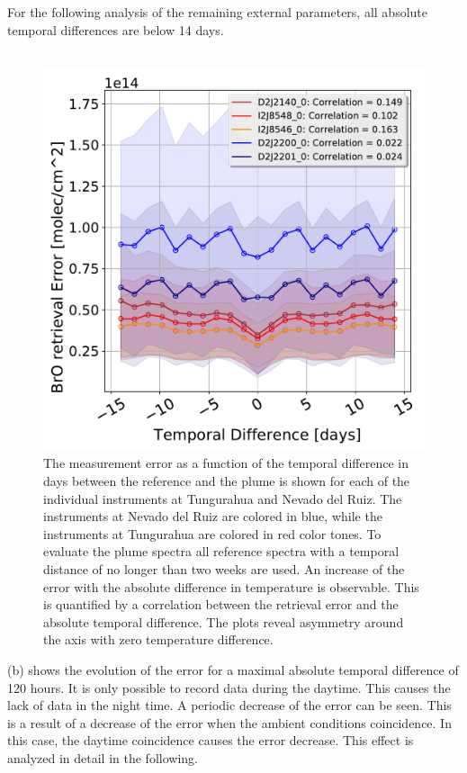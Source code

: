 For the following analysis of the remaining external parameters, all absolute temporal differences are below 14 days.\\
\\
\begin{figure}
    \centering
    \includegraphics[width=0.7\linewidth]{Bilder/DatallInstruments}
    \caption[The  measurement error as a function of the temporal difference in days between the reference and the plume is shown for each of the individual instruments at Tungurahua and Nevado del Ruiz. ]{The  measurement error as a function of the temporal difference in days between the reference and the plume is shown for each of the individual instruments at Tungurahua and Nevado del Ruiz. The instruments at Nevado del Ruiz are colored in blue, while the instruments at Tungurahua are colored in red color tones.  To evaluate the plume spectra all reference spectra with a temporal distance of no longer than two weeks are used. An increase of the  error with the absolute difference in temperature is observable. This is quantified by a correlation between the  retrieval error and the absolute temporal difference. The plots reveal  asymmetry around the axis with zero temperature difference.}
    \label{fig:datallinstruments}
\end{figure}
%
 (b) shows the evolution of the  error for a maximal absolute temporal difference of 120 hours. It is only possible to record data during the daytime. This causes the lack of data in the night time. A periodic decrease of the  error can be seen. This is a result of a decrease of the  error when the ambient conditions coincidence. In this case, the daytime coincidence causes the   error decrease. This effect is analyzed in detail in the following.


